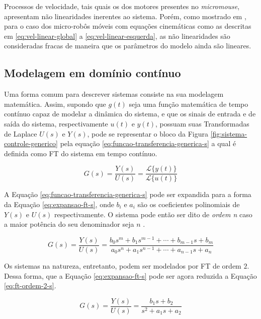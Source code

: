 		Processos de velocidade, tais quais os dos motores presentes no \textit{micromouse}, apresentam não linearidades inerentes ao sistema. Porém, como mostrado em , para o caso dos micro-robôs móveis com equações cinemáticas como as descritas em \ref{eq:vel-linear-global} a \ref{eq:vel-linear-esquerda}, as não linearidades são consideradas fracas de maneira que os parâmetros do modelo ainda são lineares.

		\subsection{Modelagem em domínio contínuo} \label{ssec:modelagem-domniio-continuo}

			Uma forma comum para descrever sistemas consiste na sua modelagem matemática. Assim, supondo que $g(t)$ seja uma função matemática de tempo contínuo capaz de modelar a dinâmica do sistema, e que os sinais de entrada e de saída do sistema, respectivamente $u(t)$ e $y(t)$, possuam suas Transformadas de Laplace $U(s)$ e $Y(s)$, pode se representar o bloco da Figura \ref{fig:sistema-controle-generico} pela equação \ref{eq:funcao-transferencia-generica-s} a qual é definida como \gls{FT} do sistema em tempo contínuo.

			\begin{equation}
				\label{eq:funcao-transferencia-generica-s}
				G(s) = \frac{Y(s)}{U(s)} = \frac{\mathcal{L}\{y(t)\}}{\mathcal{L}\{u(t)\}}
			\end{equation}
			
			A Equação \ref{eq:funcao-transferencia-generica-s} pode ser expandida para a forma da Equação \ref{eq:expansao-ft-s}, onde $b_i$ e $a_i$ são os coeficientes polinomiais de $Y(s)$ e $U(s)$ respectivamente. O sistema pode então ser dito de \textit{ordem n} caso a maior potência do seu denominador seja $n$ \cite{ogata-2010}.

			\begin{equation}
				\label{eq:expansao-ft-s}
				G(s) = \frac{Y(s)}{U(s)} =\frac{b_0 s^m + b_1 s^{m-1} + \cdots + b_{m-1} s + b_m}{a_0 s^n + a_1 s^{n-1} + \cdots + a_{n-1} s + a_n}
			\end{equation}

			Os sistemas na natureza, entretanto, podem ser modelados por \gls{FT} de ordem $2$. Dessa forma, que a Equação \ref{eq:expansao-ft-s} pode ser agora reduzida a Equação \ref{eq:ft-ordem-2-s}.

			\begin{equation}
				\label{eq:ft-ordem-2-s}
				G(s) = \frac{Y(s)}{U(s)} =\frac{b_1 s + b_2}{s^2 + a_1 s + a_2}
			\end{equation}

